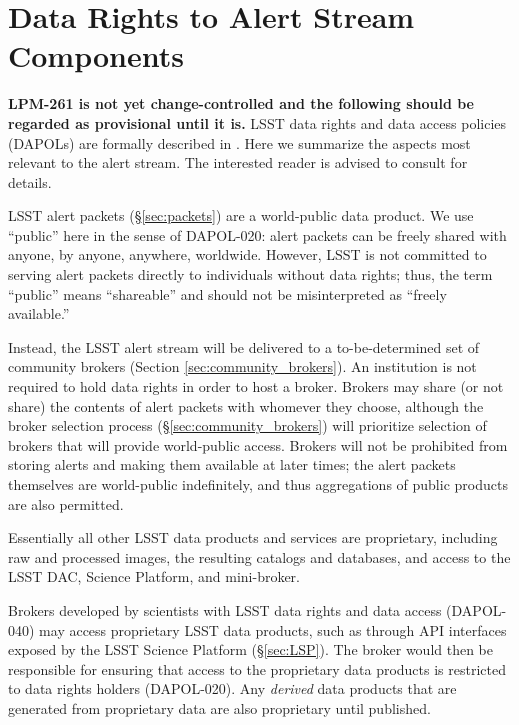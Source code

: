 \section{Data Rights to Alert Stream Components}\label{sec:data_rights}

\textbf{LPM-261 is not yet change-controlled and the following should be regarded as provisional until it is.}
LSST data rights and data access policies (DAPOLs) are formally described in . 
Here we summarize the aspects most relevant to the alert stream. 
The interested reader is advised to consult  for details. 

LSST alert packets (\S \ref{sec:packets}) are a world-public data product.
We use ``public'' here in the sense of DAPOL-020:  alert packets can be freely shared with anyone, by anyone, anywhere, worldwide.
However, LSST is not committed to serving alert packets directly to individuals without data rights;
thus, the term ``public'' means ``shareable'' and should not be misinterpreted as ``freely available.''

Instead, the LSST alert stream will be delivered to a to-be-determined set of community brokers (Section \ref{sec:community_brokers}).
An institution is not required to hold data rights in order to host a broker.
Brokers may share (or not share) the contents of alert packets with whomever they choose,
although the broker selection process (\S \ref{sec:community_brokers}) will prioritize selection of brokers that will provide world-public access.
Brokers will not be prohibited from storing alerts and making them available at later times;
the alert packets themselves are world-public indefinitely, and thus aggregations of public products are also permitted.

Essentially all other LSST data products and services are proprietary, including raw and processed images, the resulting catalogs and databases, and access to the LSST DAC, Science Platform, and mini-broker.

Brokers developed by scientists with LSST data rights and data access (DAPOL-040) may access proprietary LSST data products, such as through API interfaces exposed by the LSST Science Platform (\S \ref{sec:LSP}).
The broker would then be responsible for ensuring that access to the proprietary data products is restricted to data rights holders (DAPOL-020).
Any \textit{derived} data products that are generated from proprietary data are also proprietary until published.
